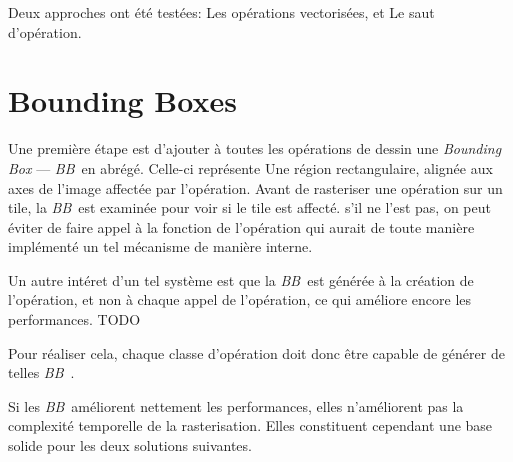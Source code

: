 		Deux approches ont été testées: Les opérations vectorisées, et Le saut d'opération.	


	\section{Bounding Boxes}
\newcommand{\BB}{\emph{BB}~}
		Une première étape est d'ajouter à toutes les opérations de dessin une \emph{Bounding Box} --- \BB en abrégé.
		Celle-ci représente
		Une région rectangulaire, alignée aux axes de l'image affectée par l'opération. Avant de rasteriser une opération 
		sur un tile, la \BB est examinée pour voir si le tile est affecté. s'il ne l'est pas, on peut éviter 
		de faire appel à la fonction de l'opération qui aurait de toute manière implémenté un tel mécanisme 
		de manière interne.

		Un autre intéret d'un tel système est que la \BB est générée à la création de l'opération, et non à
		chaque appel de l'opération, ce qui améliore encore les performances. TODO
		
		Pour réaliser cela, chaque classe d'opération doit donc être capable de générer de telles \BB.

		Si les \BB améliorent nettement les performances, elles n'améliorent pas la complexité
		temporelle de la rasterisation. Elles constituent cependant une base solide pour les deux solutions suivantes. 

